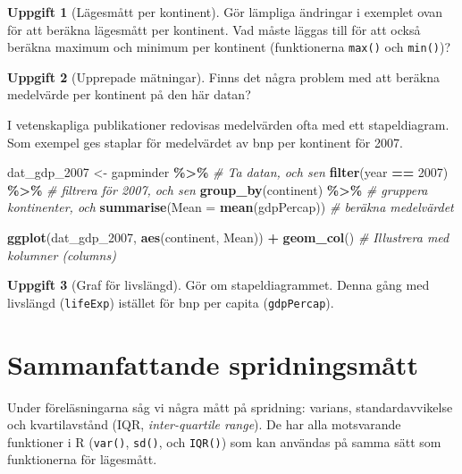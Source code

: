 \documentclass[
]{book}
\newenvironment{Shaded}{\begin{snugshade}}{\end{snugshade}}
\newcommand{\AttributeTok}[1]{\textcolor[rgb]{0.13,0.29,0.53}{#1}}
\newcommand{\CommentTok}[1]{\textcolor[rgb]{0.56,0.35,0.01}{\textit{#1}}}
\newcommand{\DecValTok}[1]{\textcolor[rgb]{0.00,0.00,0.81}{#1}}
\newcommand{\FunctionTok}[1]{\textcolor[rgb]{0.13,0.29,0.53}{\textbf{#1}}}
\newcommand{\NormalTok}[1]{#1}
\newcommand{\OtherTok}[1]{\textcolor[rgb]{0.56,0.35,0.01}{#1}}
\newcommand{\SpecialCharTok}[1]{\textcolor[rgb]{0.81,0.36,0.00}{\textbf{#1}}}
\theoremstyle{definition}
\theoremstyle{definition}
\theoremstyle{definition}
\newtheorem{exercise}{Uppgift}[chapter]
\theoremstyle{definition}
\theoremstyle{remark}
\begin{document}
\begin{exercise}[Lägesmått per kontinent]
Gör lämpliga ändringar i exemplet ovan för att beräkna lägesmått per kontinent. Vad måste läggas till för att också beräkna maximum och minimum per kontinent (funktionerna \texttt{max()} och \texttt{min()})?
\end{exercise}

\begin{exercise}[Upprepade mätningar]
Finns det några problem med att beräkna medelvärde per kontinent på den här datan?
\end{exercise}

I vetenskapliga publikationer redovisas medelvärden ofta med ett stapeldiagram. Som exempel ges staplar för medelvärdet av bnp per kontinent för 2007.

\begin{Shaded}
\begin{Highlighting}[]
\NormalTok{dat\_gdp\_2007 }\OtherTok{\textless{}{-}}\NormalTok{ gapminder }\SpecialCharTok{\%\textgreater{}\%}       \CommentTok{\# Ta datan, och sen}
  \FunctionTok{filter}\NormalTok{(year }\SpecialCharTok{==} \DecValTok{2007}\NormalTok{) }\SpecialCharTok{\%\textgreater{}\%}          \CommentTok{\# filtrera för 2007, och sen}
  \FunctionTok{group\_by}\NormalTok{(continent) }\SpecialCharTok{\%\textgreater{}\%}           \CommentTok{\# gruppera kontinenter, och}
  \FunctionTok{summarise}\NormalTok{(}\AttributeTok{Mean =} \FunctionTok{mean}\NormalTok{(gdpPercap)) }\CommentTok{\# beräkna medelvärdet}

\FunctionTok{ggplot}\NormalTok{(dat\_gdp\_2007, }\FunctionTok{aes}\NormalTok{(continent, Mean)) }\SpecialCharTok{+}
  \FunctionTok{geom\_col}\NormalTok{()                  }\CommentTok{\# Illustrera med kolumner (columns)}
\end{Highlighting}
\end{Shaded}

\begin{exercise}[Graf för livslängd]
Gör om stapeldiagrammet. Denna gång med livslängd (\texttt{lifeExp}) istället för bnp per capita (\texttt{gdpPercap}).
\end{exercise}

\section{Sammanfattande spridningsmått}\label{sammanfattande-spridningsmuxe5tt}

Under föreläsningarna såg vi några mått på spridning: varians, standardavvikelse och kvartilavstånd (IQR, \emph{inter-quartile range}). De har alla motsvarande funktioner i R (\texttt{var()}, \texttt{sd()}, och \texttt{IQR()}) som kan användas på samma sätt som funktionerna för lägesmått.
\end{document}
